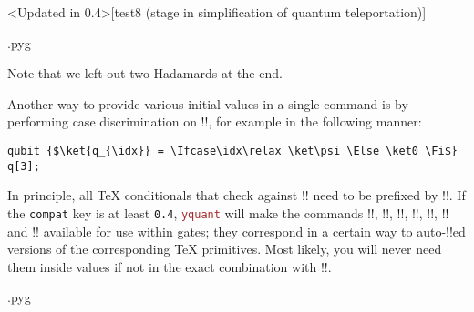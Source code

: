 \documentclass{scrartcl}
\makeatletter
\newenvironment{codeexample}{%
   \VerbatimEnvironment%
   \let\FVB@VerbatimOut\minted@FVB@VerbatimOut
   \let\FVE@VerbatimOut\minted@FVE@VerbatimOut
   \minted@configlang{tex}%
   \minted@fvset
   \begin{VerbatimOut}[codes={\catcode`\^^I=12},firstline,lastline]{\minted@jobname.pyg}%
}{
   \end{VerbatimOut}%
   \minted@langlinenoson%
   \savebox\codeexamplebox{ \minted@jobname.pyg}%
   \ifdim\wd\codeexamplebox>\dimexpr.5\linewidth-3mm\relax%
      \wd\codeexamplebox=.5\linewidth%
   \else%
      \wd\codeexamplebox=\dimexpr\wd\codeexamplebox+3mm\relax%
   \fi%
   \noindent\begin{minipage}{\wd\codeexamplebox}%
      \centering%
      \usebox\codeexamplebox%
   \end{minipage}%
   \begin{minipage}{\dimexpr\linewidth-\wd\codeexamplebox\relax}%
      \expandafter\minted@pygmentize\expandafter{\minted@lang}%
   \end{minipage}%
   \minted@langlinenosoff%
   \par%
}
\def\pkg#1{\textcolor{brown}{\texttt{#1}}}
\def\Yquant{\pkg{yquant}}
\makeatother
\begin{document}
         \clearpage
         \begin{example}<Updated in 0.4>[test8 (stage in simplification of quantum teleportation)]
            \begin{codeexample}
            \end{codeexample}
            Note that we left out two Hadamards at the end.

            Another way to provide various initial values in a single command is by performing case discrimination on \tex!\idx!, for example in the following manner:

            \begin{verbatim}
qubit {$\ket{q_{\idx}} = \Ifcase\idx\relax \ket\psi \Else \ket0 \Fi$} q[3];
            \end{verbatim}
            In principle, all \TeX{} conditionals that check against \tex!\idx! need to be prefixed by \tex!\protect!.
            If the \texttt{compat} key is at least \texttt{0.4}, \Yquant{} will make the commands \tex!\Ifnum!, \tex!\Ifcase!, \tex!\Or!, \tex!\Else!, \tex!\Fi!, \tex!\Unless! and \tex!\The! available for use within gates; they correspond in a certain way to auto\hyp\tex!\protect!ed versions of the corresponding \TeX{} primitives.
            Most likely, you will never need them inside values if not in the exact combination with \tex!\idx!.
         \end{example}

         \clearpage
         \begin{example}
            \begin{codeexample}
            \end{codeexample}
         \end{example}
\end{document}
